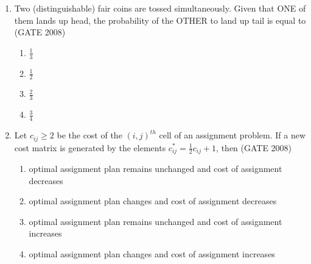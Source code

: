 \documentclass[journal]{IEEEtran}
\begin{document}
\begin{enumerate}
{where $U_i = \frac{X_i - 80}{3}, i=1,2,\ldots,10$. Then the value of $E(ST)$ is equal to \hfill (GATE 2008)
\begin{multicols}{4}
    \begin{enumerate}
        \item $0$
        \item $1$
        \item $10$
        \item $\frac{80}{3}$
    \end{enumerate}
\end{multicols}
}

\item{ Two (distinguishable) fair coins are tossed simultaneously. Given that ONE of them lands up head, the probability of the OTHER to land up tail is equal to \hfill (GATE 2008)
\begin{multicols}{4}
    \begin{enumerate}
        \item $\frac{1}{3}$
        \item $\frac{1}{2}$
        \item $\frac{2}{3}$
        \item $\frac{3}{4}$
    \end{enumerate}
\end{multicols}
}

\item{ Let $c_{ij}\geq2$ be the cost of the $(i, j)^{th}$ cell of an assignment problem. If a new cost matrix is generated by the elements $c_{ij}^*= \frac{1}{2} c_{ij} +1$, then \hfill (GATE 2008)

\begin{enumerate}
    \item optimal assignment plan remains unchanged and cost of assignment decreases 
    \item optimal assignment plan changes and cost of assignment decreases
    \item optimal assignment plan remains unchanged and cost of assignment increases 
    \item optimal assignment plan changes and cost of assignment increases
\end{enumerate}
}





\end{enumerate}
\end{document}
